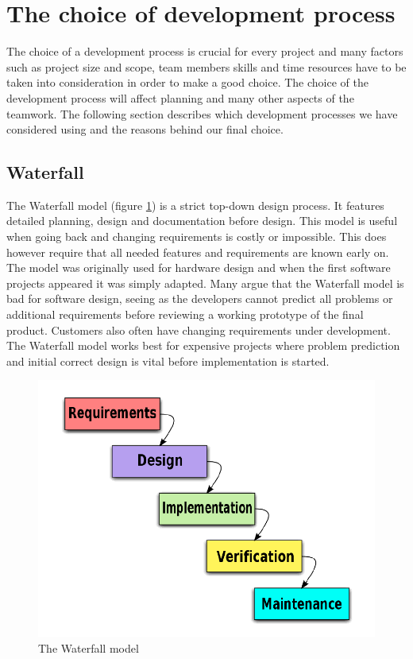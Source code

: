 \section{The choice of development process}
The choice of a development process is crucial for every project\cite{book:software-engineering} 
and many factors such as project size and scope, team members skills and time resources have to 
be taken into consideration in order to make a good choice. The choice of the development process 
will affect planning and many other aspects of the teamwork. The following section describes
which development processes we have considered using and the reasons behind our final choice.

\subsection{Waterfall}
The Waterfall model (figure \ref{fig:designmodel-waterfall}) is a strict top-down design process.
It features detailed planning, design and documentation before design. This model is useful when going back
and changing requirements is costly or impossible. This does however require that all needed features and
requirements are known early on. The model was originally used for hardware design and when the first software projects 
appeared it was simply adapted. Many argue that the Waterfall model is bad for software design, seeing
as the developers cannot predict all problems or additional requirements before reviewing a working
prototype of the final product. Customers also often have changing requirements under development.
The Waterfall model works best for expensive projects where problem prediction and initial correct design
is vital before implementation is started.
\begin{figure}[h!]
\centering \includegraphics[scale=0.30]{img/designmodel-waterwall}
\caption{The Waterfall model\cite{link:wiki-waterfall}}
\label{fig:designmodel-waterfall}
\end{figure}

